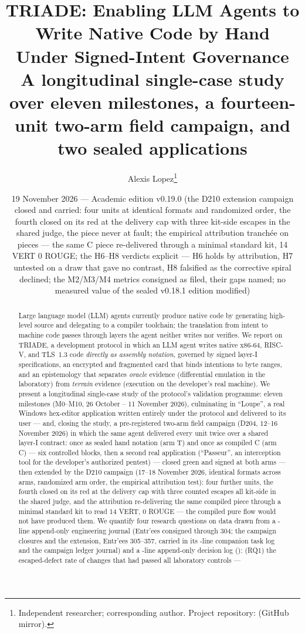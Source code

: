 \documentclass[11pt,a4paper]{article}
\title{\textbf{TRIADE: Enabling LLM Agents to Write Native Code by Hand\\
Under Signed-Intent Governance\\
\large A longitudinal single-case study over eleven milestones, a
fourteen-unit two-arm field campaign, and two sealed applications}}
\author{Alexis Lopez\thanks{Independent researcher; corresponding author.
Project repository: \code{alexisfrlopez-debug/triade} (GitHub mirror).}}
\date{19 November 2026 — Academic edition v0.19.0 (the D210 extension campaign closed and carried: four units at identical formats and randomized order, the fourth closed on its red at the delivery cap with three kit-side escapes in the shared judge, the piece never at fault; the empirical attribution tranchée on pieces --- the same C piece re-delivered through a minimal standard kit, 14 VERT 0 ROUGE; the H6--H8 verdicts explicit --- H6 holds by attribution, H7 untested on a draw that gave no contrast, H8 falsified as the corrective spiral declined; the M2/M3/M4 metrics consigned as filed, their gaps named; no measured value of the sealed v0.18.1 edition modified)}
\begin{document}
\maketitle
\thispagestyle{fancy}

\begin{abstract}
\noindent Large language model (LLM) agents currently produce native code by
generating high-level source and delegating to a compiler toolchain; the
translation from intent to machine code passes through layers the agent
neither writes nor verifies. We report on TRIADE, a development protocol in
which an LLM agent writes native x86-64, RISC-V, and TLS~1.3 code
\emph{directly as assembly notation}, governed by signed layer-I
specifications, an encrypted and fragmented card that binds intentions to
byte ranges, and an epistemology that separates \emph{oracle} evidence
(differential emulation in the laboratory) from \emph{terrain} evidence
(execution on the developer's real machine). We present a longitudinal
single-case study of the protocol's validation programme: eleven milestones
(M0--M10, 26 October -- 11 November 2026), culminating in ``Loupe'', a real
Windows hex-editor application written entirely under the protocol and
delivered to its user --- and, closing the study, a pre-registered
two-arm field campaign (D204, 12--16 November 2026) in which the same
agent delivered every unit twice over a shared layer-I contract: once
as sealed hand notation (arm T) and once as compiled C (arm C) --- six
controlled blocks, then a second real application (``Passeur'', an
interception tool for the developer's authorized pentest) --- closed
green and signed at both arms --- then extended by the D210 campaign
(17--18 November 2026, identical formats across arms, randomized arm
order, the empirical attribution test): four further units, the fourth
closed on its red at the delivery cap with three counted escapes all
kit-side in the shared judge, and the attribution re-delivering the same
compiled piece through a minimal standard kit to read 14 VERT, 0 ROUGE
--- the compiled pure flow would not have produced them. We quantify
four research questions on data drawn
from a \nbLignesJournal-line append-only engineering journal (Entr'ees
consigned through 304; the campaign closures and the extension, Entr'ees
305--357,
carried in its \nbLignesWorklog-line companion task log and the campaign
ledger journal) and a \nbLignesDecisions-line append-only decision log
(\plageDecisions): (RQ1) the
escaped-defect rate of changes that had passed all laboratory controls ---

\end{abstract}
\end{document}
